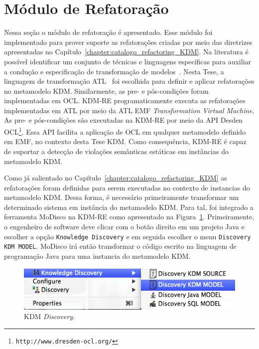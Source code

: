 \section{Módulo de Refatoração}

Nessa seção o módulo de refatoração é apresentado. Esse módulo foi implementado para prover suporte as refatorações criadas por meio das diretrizes apresentadas no Capítulo~\ref{chapter:catalogo_refactoring_KDM}. Na literatura é possível identificar um conjunto de técnicas e linguagens específicas para auxiliar a condução e especificação de transformação de modelos~\cite{Biehl_2010, Mens_2006, Allilaire_06}. Nesta Tese, a linguagem de transformação ATL~\cite{ATL_eclipse,Jouault_2008} foi escolhida para definir e aplicar refatorações no metamodelo KDM. Similarmente, as pre- e pós-condições foram implementadas em OCL. KDM-RE programaticamente executa as refatorações implementadas em ATL por meio da ATL EMF \textit{Transformation Virtual Machine}. As pre- e pós-condições são executadas na KDM-RE por meio da API Desden OCL\footnote{\texttt{http://www.dresden-ocl.org/}}. Essa API facilita a aplicação de OCL em qualquer metamodelo definido em EMF, no contexto desta Tese KDM. Como consequência, KDM-RE é capaz de suportar a detecção de violações semânticas estáticas em instâncias do metamodelo KDM.


Como já salientado no Capítulo~\ref{chapter:catalogo_refactoring_KDM} as refatorações foram definidas para serem executadas no contexto de instancias do metamodelo KDM. Dessa forma, é necessário primeiramente transformar um determinado sistema em instância do metamodelo KDM. Para tal, foi integrado a ferramenta MoDisco na KDM-RE como apresentado na Figura~\ref{fig:kdm_modisco_discovery}. Primeiramente, o engenheiro de software deve clicar com o botão direito em um projeto Java e escolher a opção \texttt{Knowledge Discovery} e em seguida escolher o menu \texttt{Discovery KDM MODEL}. MoDisco irá então transformar o código escrito na linguagem de programação Java para uma instancia do metamodelo KDM. 

\begin{figure}[h]
	\centering
	\caption{KDM \textit{Discovery}.}
	\label{fig:kdm_modisco_discovery}
	\includegraphics[scale=0.65]{images/kdm_discovery_kdm_re}
	\fautor
\end{figure}


